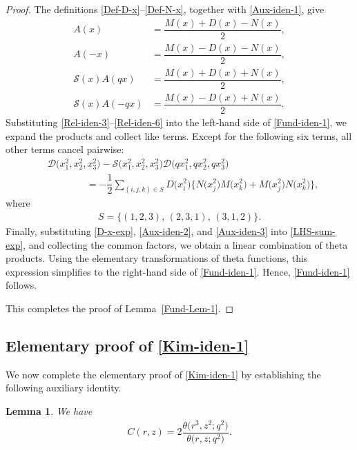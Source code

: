 \documentclass[12pt,reqno]{amsart}
\numberwithin{equation}{section}
\theoremstyle{plain}
\newtheorem{lemma}[theorem]{Lemma}
\theoremstyle{definition}
\begin{document}
\begin{proof}
The definitions \eqref{Def-D-x}--\eqref{Def-N-x}, together with \eqref{Aux-iden-1},
give
\begin{align}
A(x) &=\dfrac{M(x)+D(x)-N(x)}{2},\label{Rel-iden-3}\\
A(-x) &=\dfrac{M(x)-D(x)-N(x)}{2},\label{Rel-iden-4}\\
\mathscr{S}(x)A(qx) &=\dfrac{M(x)+D(x)+N(x)}{2},\label{Rel-iden-5}\\
\mathscr{S}(x)A(-qx) &=\dfrac{M(x)-D(x)+N(x)}{2}.\label{Rel-iden-6}
\end{align}
Substituting \eqref{Rel-iden-3}--\eqref{Rel-iden-6} into the left-hand side of
\eqref{Fund-iden-1}, we expand the products and collect like terms. Except for the
following six terms, all other terms cancel pairwise:
\begin{align}
 &\mathscr{D}\big(x_1^2,x_2^2,x_3^2\big)-\mathscr{S}\big(x_1^2,x_2^2,x_3^2\big)
\mathscr{D}\big(qx_1^2,qx_2^2,qx_3^2\big)\nonumber\\
 &\qquad\qquad=-\dfrac{1}{2}\sum_{(i,j,k)\in S}D\big(x_i^2\big)\big\{N\big(x_j^2\big)
M\big(x_k^2\big)+M\big(x_j^2\big)N\big(x_k^2\big)\big\},\label{LHS-sum-exp}
\end{align}
where
\begin{align*}
S=\{(1,2,3),\,(2,3,1),\,(3,1,2)\}.
\end{align*}
Finally, substituting \eqref{D-x-exp}, \eqref{Aux-iden-2}, and \eqref{Aux-iden-3} into
\eqref{LHS-sum-exp}, and collecting the common factors, we obtain a linear combination
of theta products. Using the elementary transformations of theta functions, this
expression simplifies to the right-hand side of \eqref{Fund-iden-1}. Hence,
\eqref{Fund-iden-1} follows.

This completes the proof of Lemma~\ref{Fund-Lem-1}.
\end{proof}


\subsection{Elementary proof of \texorpdfstring{\eqref{Kim-iden-1}}{}}
We now complete the elementary proof of \eqref{Kim-iden-1} by establishing the following
auxiliary identity.

\begin{lemma}
We have
\begin{align}
C(r,z)=2\dfrac{\theta\big(r^3,z^2;q^2\big)}{\theta\big(r,z;q^2\big)}.\label{Fund-iden-2}
\end{align}
\end{lemma}
\end{document}
